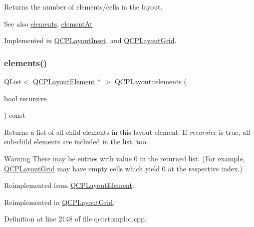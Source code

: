 Returns the number of elements/cells in the layout.

\begin{DoxySeeAlso}{See also}
\hyperlink{class_q_c_p_layout_adc9ebc73fc215f9cc22796712a251ff4}{elements}, \hyperlink{class_q_c_p_layout_afa73ca7d859f8a3ee5c73c9b353d2a56}{element\+At} 
\end{DoxySeeAlso}


Implemented in \hyperlink{class_q_c_p_layout_inset_a0398918a888fa7974a6776dc47fc5d2e}{Q\+C\+P\+Layout\+Inset}, and \hyperlink{class_q_c_p_layout_grid_a77f194843d037e0da6d5f3170acdf3a2}{Q\+C\+P\+Layout\+Grid}.

\mbox{\label{class_q_c_p_layout_adc9ebc73fc215f9cc22796712a251ff4}} 
\subsubsection{\texorpdfstring{elements()}{elements()}}
{\footnotesize\ttfamily Q\+List$<$ \hyperlink{class_q_c_p_layout_element}{Q\+C\+P\+Layout\+Element} $\ast$ $>$ Q\+C\+P\+Layout\+::elements (\begin{DoxyParamCaption}\item[{bool}]{recursive }\end{DoxyParamCaption}) const\hspace{0.3cm}{\ttfamily [virtual]}}

Returns a list of all child elements in this layout element. If {\itshape recursive} is true, all sub-\/child elements are included in the list, too.

\begin{DoxyWarning}{Warning}
There may be entries with value 0 in the returned list. (For example, \hyperlink{class_q_c_p_layout_grid}{Q\+C\+P\+Layout\+Grid} may have empty cells which yield 0 at the respective index.) 
\end{DoxyWarning}


Reimplemented from \hyperlink{class_q_c_p_layout_element_a76dec8cb31e498994a944d7647a43309}{Q\+C\+P\+Layout\+Element}.



Reimplemented in \hyperlink{class_q_c_p_layout_grid_a20a745d013de4c89cf5de8004a5a36f7}{Q\+C\+P\+Layout\+Grid}.



Definition at line 2148 of file qcustomplot.\+cpp.

